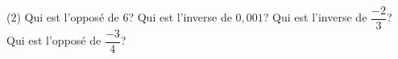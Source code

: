 %
%
    \begin{tasks}(2)
        \task Qui est l'opposé de $6$?
        \task Qui est l'inverse de $0,001$?
        \task Qui est l'inverse de $\dfrac{-2}{3}$?
        \task Qui est l'opposé de $\dfrac{-3}{4}$?
    \end{tasks}
